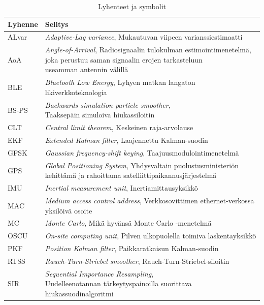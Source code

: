\documentclass[
  12pt,
  a4paper, twoside]{book}
\begin{document}
\begin{table}

\caption{\label{tab:lyhenteet-ja-symbolit}Lyhenteet ja symbolit}
\centering
\begin{tabular}[t]{ll}
\toprule
Lyhenne & Selitys\\
\midrule
ALvar & \textit{Adaptive-Lag variance}, Mukautuvan viipeen varianssiestimaatti\\
AoA & \makecell[l]{\textit{Angle-of-Arrival}, Radiosignaalin tulokulman estimointimenetelmä,\\joka perustuu saman signaalin erojen tarkasteluun\\useamman antennin välillä}\\
BLE & \textit{Bluetooth Low Energy}, Lyhyen matkan langaton likiverkkoteknologia\\
BS-PS & \makecell[l]{\textit{Backwards simulation particle smoother},\\Taaksepäin simuloiva hiukassiloitin}\\
CLT & \textit{Central limit theorem}, Keskeinen raja-arvolause\\
\addlinespace
EKF & \textit{Extended Kalman filter}, Laajennettu Kalman-suodin\\
GFSK & \textit{Gaussian frequency-shift keying}, Taajuusmodulointimenetelmä\\
GPS & \makecell[l]{\textit{Global Positioning System}, Yhdysvaltain puolustusministeriön\\kehittämä ja rahoittama satelliittipaikannusjärjestelmä}\\
IMU & \textit{Inertial measurement unit}, Inertiamittausyksikkö\\
MAC & \makecell[l]{\textit{Medium access control address}, Verkkosovittimen ethernet-verkossa\\yksilöivä osoite}\\
\addlinespace
MC & \textit{Monte Carlo}, Mikä hyvänsä Monte Carlo -menetelmä\\
OSCU & \textit{On-site computing unit}, Pilven ulkopuolella toimiva laskentayksikkö\\
PKF & \textit{Position Kalman filter}, Paikkaratkaisun Kalman-suodin\\
RTSS & \textit{Rauch-Turn-Striebel smoother}, Rauch-Turn-Striebel-siloitin\\
SIR & \makecell[l]{\textit{Sequential Importance Resampling},\\Uudelleenotannan tärkeytyspainoilla suorittava hiukassuodinalgoritmi}\\

\end{tabular}
\end{table}
\end{document}
